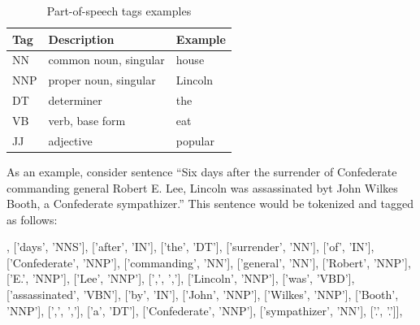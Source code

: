 \documentclass[12pt, twoside]{fithesis2}		%
\renewcommand{\_}{\leavevmode \kern0.07em\vbox{\hrule width0.4em}}
\begin{document}
\begin{table}[h]
\begin{center}
\begin{tabular}{| l | l | l |}
  \hline
  Tag & Description & Example \\
  \hline \hline
  NN & common noun, singular & house         \\ \hline
  NNP & proper noun, singular & Lincoln     \\ \hline
  DT & determiner & the \\ \hline
  VB & verb, base form & eat \\ \hline
  JJ & adjective & popular \\ \hline
\end{tabular}
\end{center}
\caption{Part-of-speech tags examples \cite{penn-tagset} }
\end{table}

As an example, consider sentence ``Six days after the surrender of Confederate commanding general Robert E. Lee, Lincoln was assassinated byt John Wilkes Booth, a Confederate sympathizer.'' This sentence would be tokenized and tagged as follows:
\begin{code}
[['Six', 'CD'], ['days', 'NNS'], ['after', 'IN'], ['the', 'DT'],
['surrender', 'NN'], ['of', 'IN'], ['Confederate', 'NNP'],
['commanding', 'NN'], ['general', 'NN'], ['Robert', 'NNP'],
['E.', 'NNP'], ['Lee', 'NNP'], [',', ','], ['Lincoln', 'NNP'],
['was', 'VBD'], ['assassinated', 'VBN'], ['by', 'IN'],
['John', 'NNP'], ['Wilkes', 'NNP'], ['Booth', 'NNP'],
[',', ','], ['a', 'DT'], ['Confederate', 'NNP'],
['sympathizer', 'NN'], ['.', '.']],
\end{code}
\end{document}
